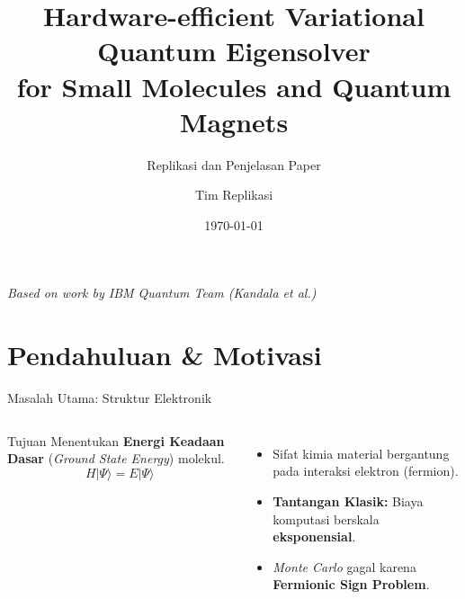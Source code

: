 \documentclass[aspectratio=169, 10pt]{beamer}
\title[Hardware-Efficient VQE]{Hardware-efficient Variational Quantum Eigensolver\\for Small Molecules and Quantum Magnets}
\subtitle{Replikasi dan Penjelasan Paper}
\author{Tim Replikasi}
\institute[DreamyTA]{DreamyTA Project}
\date{\today}
\begin{document}
\begin{frame}
    \titlepage
    \begin{center}
        \textit{\small Based on work by IBM Quantum Team (Kandala et al.)}
    \end{center}
\end{frame}

\section{Pendahuluan \& Motivasi}

\begin{frame}{Masalah Utama: Struktur Elektronik}
    \begin{columns}
        \begin{block}{Tujuan}
            Menentukan \textbf{Energi Keadaan Dasar} (\textit{Ground State Energy}) molekul.
            $$ H |\Psi\rangle = E |\Psi\rangle $$
        \end{block}
        \vspace{0.5em}
        \begin{itemize}
            \item Sifat kimia material bergantung pada interaksi elektron (fermion).
            \item \textbf{Tantangan Klasik:} Biaya komputasi berskala \textbf{eksponensial}.
            \item \textit{Monte Carlo} gagal karena \textbf{Fermionic Sign Problem}.
        \end{itemize}

        \centering
    \end{columns}
\end{frame}
\end{document}
